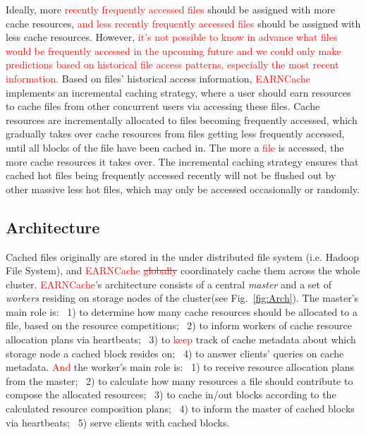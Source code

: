Ideally, more \textcolor{red}{recently frequently accessed files} should be assigned with more cache resources, \textcolor{red}{and less recently frequently accessed files}
should be assigned with less cache resources. However, \textcolor{red}{it's not possible to know in advance what files would be frequently accessed in the upcoming future and we could only make predictions based on historical file access patterns, especially the most recent information.}
Based on files' historical access information, \textcolor{red}{EARNCache} implements an incremental caching strategy, where a user should earn resources to cache files from other concurrent users via accessing these files. Cache resources are incrementally allocated to files becoming frequently accessed, which gradually takes over cache resources from files getting less frequently accessed, until all blocks of the file have been cached in. The more a \textcolor{red}{file} is accessed, the more cache resources it takes over. The incremental caching strategy ensures that cached hot files being frequently accessed recently will not be flushed out by other massive less hot files, which may only be accessed occasionally or randomly.

\subsection{Architecture}\label{sec:Arch}
Cached files originally are stored in the under distributed file system (i.e. Hadoop File System), and \textcolor{red}{EARNCache} \textcolor{red}{\sout{globally}} coordinately cache them across the whole cluster. \textcolor{red}{EARNCache}'s architecture consists of a central \emph{master} and a set of \emph{workers} residing on storage nodes of the cluster(see Fig.~\ref{fig:Arch}). 
The master's main role is: ~1) to determine how many cache resources should be allocated to a file, based on the resource competitions; ~2) to inform workers of cache resource allocation plans via heartbeats; ~3) to \textcolor{red}{keep} track of cache metadata about which storage node a cached block resides on; ~4) to answer clients' queries on cache metadata. \textcolor{red}{And} the worker's main role is: ~1) to receive resource allocation plans from the master; ~2) to calculate how many resources a file should contribute to compose the allocated resources; ~3) to cache in/out blocks according to the calculated resource composition plans; ~4) to inform the master of cached blocks via heartbeats; ~5) serve clients with cached blocks.

